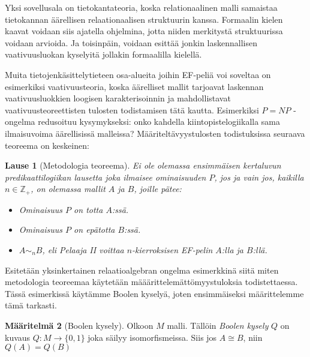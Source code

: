 \documentclass[finnish]{tktltiki2}
\newtheorem{lau}{Lause}
\theoremstyle{definition}
\newtheorem{maar}[lau]{Määritelmä}
\theoremstyle{remark}
\begin{document}
Yksi sovellusala on tietokantateoria, koska relationaalinen malli samaistaa tietokannan äärellisen relaationaalisen struktuurin kanssa. Formaalin kielen kaavat voidaan siis ajatella ohjelmina, jotta niiden merkitystä struktuurissa voidaan arvioida. Ja toisinpäin, voidaan esittää jonkin laskennallisen vaativuusluokan kyselyitä jollakin formaalilla kielellä.

Muita tietojenkäsittelytieteen osa-alueita joihin EF-peliä voi soveltaa on esimerkiksi vaativuusteoria, koska äärelliset mallit tarjoavat laskennan vaativuusluokkien loogisen karakterisoinnin ja mahdollistavat vaativuusteoreettisten tulosten todistamisen tätä kautta. Esimerkiksi $P = NP$ -ongelma redusoituu kysymykseksi: onko kahdella kiintopistelogiikalla sama ilmaisuvoima äärellisissä malleissa? Määriteltävyystulosten todistuksissa seuraava teoreema on keskeinen:

\begin{lau}[Metodologia teoreema]
Ei ole olemassa ensimmäisen kertaluvun predikaattilogiikan lausetta joka ilmaisee ominaisuuden $P$, jos ja vain jos, kaikilla $n \in \mathbb{Z}_+$, on olemassa mallit $A$ ja $B$, joille pätee:
\begin{itemize}
\item Ominaisuus $P$ on totta $A$:ssä.
\item Ominaisuus $P$ on epätotta $B$:ssä.
\item $A \sim_n B$, eli Pelaaja II voittaa $n$-kierroksisen EF-pelin $A$:lla ja $B$:llä.
\end{itemize}
\end{lau}

Esitetään yksinkertainen relaatioalgebran ongelma esimerkkinä siitä miten metodologia teoreemaa käytetään määärittelemättömyystuloksia todistettaessa. Tässä esimerkissä käytämme Boolen kyselyä, joten ensimmäiseksi määrittelemme tämä tarkasti.

\begin{maar}[Boolen kysely]
Olkoon $M$ malli. Tällöin \textit{Boolen kysely} $Q$ on kuvaus $Q: M \to \{0, 1\}$ joka säilyy isomorfismeissa. Siis jos $A \cong B$, niin $Q(A) = Q(B)$
\end{maar}
\end{document}
